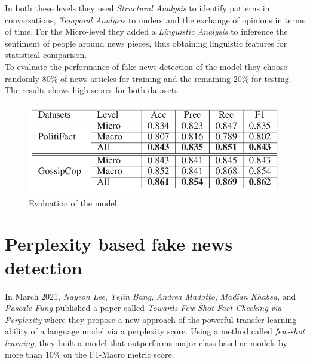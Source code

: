\documentclass[10pt, english]{report}
\begin{document}
In both these levels they used \textit{Structural Analysis} to identify patterns in conversations, \textit{Temporal Analysis} to understand the exchange of opinions in terms of time. For the Micro-level they added a \textit{Linguistic Analysis} to inference the sentiment of people around news pieces, thus obtaining linguistic features for statistical comparison.\\

To evaluate the performance of fake news detection of the model they choose randomly 80\% of news articles for training and the remaining 20\% for testing. The results shows high scores for both datasets:

\begin{figure}[H]
	\centering
	\includegraphics[scale=0.4]{img/hierarchical_evaluation_results.png}
	\caption{Evaluation of the model. \cite{shu2020hierarchical}}
\end{figure}


\section{Perplexity based fake news detection \cite{lee2021towards} \cite{lee2020misinformation}}
In March 2021, \textit{Nayeon Lee}, \textit{Yejin Bang}, \textit{Andrea Madotto}, \textit{Madian Khabsa}, and \textit{Pascale Fung} published a paper called \textit{Towards Few-Shot Fact-Checking via Perplexity} where they propose a new approach of the powerful transfer learning ability of a language model via a perplexity score. Using a method called \textit{few-shot learning}, they built a model that outperforms major class baseline models by more than 10\% on the F1-Macro metric score.\\
\end{document}
